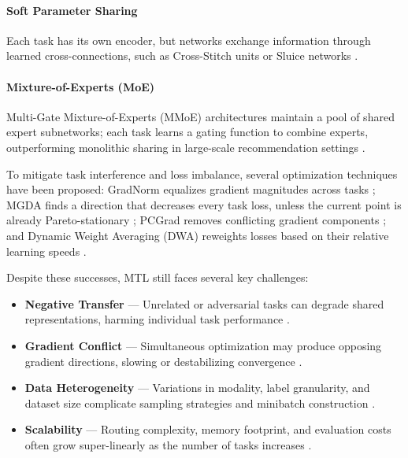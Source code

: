 \paragraph*{Soft Parameter Sharing}  
Each task has its own encoder, but networks exchange information through learned cross-connections, such as Cross-Stitch units \cite{misra2016cross} or Sluice networks \cite{ruder2017sluice}.
\paragraph*{Mixture-of-Experts (MoE)}  
Multi-Gate Mixture-of-Experts (MMoE) architectures maintain a pool of shared expert subnetworks; each task learns a gating function to combine experts, outperforming monolithic sharing in large-scale recommendation settings \cite{ma2018mmoe,yu2019mmoe}.

To mitigate task interference and loss imbalance, several optimization techniques have been proposed: GradNorm equalizes gradient magnitudes across tasks \cite{chen2018gradnorm}; MGDA finds a direction that decreases every task loss, unless the current point is already Pareto-stationary \cite{sener2018mgda};
PCGrad removes conflicting gradient components \cite{yu2020pcgrad}; and Dynamic Weight Averaging (DWA) reweights losses based on their relative learning speeds \cite{liu2019dwa}.

Despite these successes, MTL still faces several key challenges:
\begin{itemize}
  \item \textbf{Negative Transfer} — Unrelated or adversarial tasks can degrade shared representations, harming individual task performance \cite{ruder2017sluice,zhang2021survey}.
  \item \textbf{Gradient Conflict} — Simultaneous optimization may produce opposing gradient directions, slowing or destabilizing convergence \cite{yu2020pcgrad,sener2018mgda}.
  \item \textbf{Data Heterogeneity} — Variations in modality, label granularity, and dataset size complicate sampling strategies and minibatch construction \cite{nash,standley2020tasks}.
  \item \textbf{Scalability} — Routing complexity, memory footprint, and evaluation costs often grow super-linearly as the number of tasks increases \cite{zhang2021survey,yu2024survey}.
\end{itemize}


